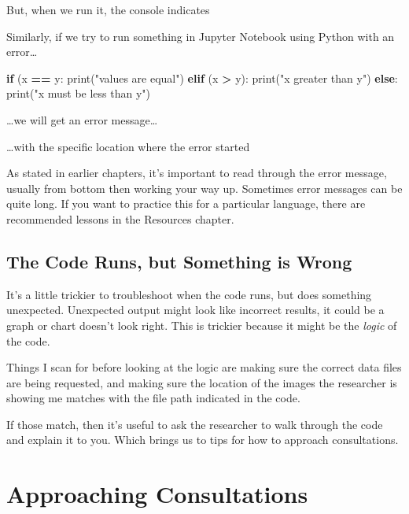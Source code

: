 \documentclass[
]{book}
\newenvironment{Shaded}{\begin{snugshade}}{\end{snugshade}}
\newcommand{\BuiltInTok}[1]{#1}
\newcommand{\ControlFlowTok}[1]{\textcolor[rgb]{0.13,0.29,0.53}{\textbf{#1}}}
\newcommand{\NormalTok}[1]{#1}
\newcommand{\OperatorTok}[1]{\textcolor[rgb]{0.81,0.36,0.00}{\textbf{#1}}}
\newcommand{\StringTok}[1]{\textcolor[rgb]{0.31,0.60,0.02}{#1}}
\begin{document}
But, when we run it, the console indicates

Similarly, if we try to run something in Jupyter Notebook using Python with an error\ldots{}

\begin{Shaded}
\begin{Highlighting}[]
\ControlFlowTok{if}\NormalTok{ (x }\OperatorTok{==}\NormalTok{ y:}
  \BuiltInTok{print}\NormalTok{(}\StringTok{"values are equal"}\NormalTok{)}
\ControlFlowTok{elif}\NormalTok{ (x }\OperatorTok{\textgreater{}}\NormalTok{ y):}
  \BuiltInTok{print}\NormalTok{(}\StringTok{"x greater than y"}\NormalTok{)}
\ControlFlowTok{else}\NormalTok{:}
  \BuiltInTok{print}\NormalTok{(}\StringTok{"x must be less than y"}\NormalTok{)}
\end{Highlighting}
\end{Shaded}

\ldots we will get an error message\ldots{}

\ldots with the specific location where the error started

As stated in earlier chapters, it's important to read through the error message,
usually from bottom then working your way up. Sometimes error messages can be
quite long. If you want to practice this for a particular
language, there are recommended lessons in the Resources chapter.

\subsection{The Code Runs, but Something is Wrong}\label{the-code-runs-but-something-is-wrong}

It's a little trickier to troubleshoot when the code runs, but does something
unexpected. Unexpected output might look like incorrect results, it could be a
graph or chart doesn't look right. This is trickier because it might be the
\emph{logic} of the code.

Things I scan for before looking at the logic are making sure the correct data files
are being requested, and making sure the location of the images the researcher is
showing me matches with the file path indicated in the code.

If those match, then it's useful to ask the researcher to walk through the code
and explain it to you. Which brings us to tips for how to approach consultations.

\section{Approaching Consultations}\label{approaching-consultations}
\end{document}
